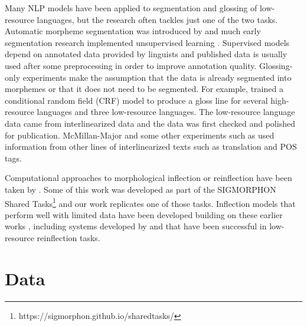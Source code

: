 Many NLP models have been applied to segmentation and glossing of low-resource languages, but the research often tackles just one of the two tasks. Automatic morpheme segmentation was introduced by \citet{harris_phoneme_1970} and much early segmentation research implemented unsupervised learning \cite{goldsmith_unsupervised_2001,creutz_unsupervised_2002,poon_unsupervised_2009}. Supervised models depend on annotated data provided by linguists and published data is usually used after some preprocessing in order to improve annotation quality. 
Glossing-only experiments make the assumption that the data is already segmented into morphemes or that it does not need to be segmented. For example, \citet{mcmillan-major_automating_2020} trained a conditional random field (CRF) model to produce a gloss line for several high-resource languages and three low-resource languages. The low-resource language data came from interlinearized data and the data was first checked and polished for publication. McMillan-Major and some other experiments such as \citet{samardzic_automatic_2015} used information from other lines of interlinearized texts such as translation and POS tags.

Computational approaches to morphological inflection or reinflection have been taken by \citet{durrett-denero-2013-supervised,nicolai-etal-2015-inflection,faruqui-etal-2016-morphological,kann-schutze-2016-single,aharoni-goldberg-2017-morphological}. Some of this work was developed as part of the SIGMORPHON Shared Tasks\footnote{https://sigmorphon.github.io/sharedtasks/} and our work replicates one of those tasks. Inflection models that perform well with limited data have been developed building on these earlier works \cite{kann-etal-2017-one,sharma-etal-2018-iit,makarov-clematide-2018-imitation,kann2020learning}, including systems developed by  and  that have been successful in low-resource reinflection tasks.

\section{Data}
\label{sec:data}

